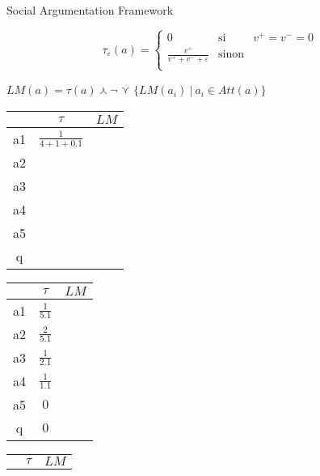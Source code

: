 \documentclass{beamer}
\begin{document}
  \begin{frame}{Social Argumentation Framework}
    \begin{overprint}
      $$
      \tau_\varepsilon(a) = \left\{
          \begin{array}{lll}
            0 & \mbox{si } & v^+ = v^- = 0\\
            \frac{v^+}{v^+ + v^- + \varepsilon} & \mbox{sinon} & \\
          \end{array}\right.$$

      $LM(a) = \tau(a) \curlywedge \neg$ {\Large $\curlyvee$} $\{LM(a_i)\ |\ a_i \in Att(a)\}$
    \end{overprint}


    \begin{minipage}[c]{.6\linewidth}
      \begin{overprint}
        \begin{tabular}{|c|c|c|}
          \hline
          & $\tau$ & $LM$\\
          \hline
          a1 & $\frac{1}{4+1+0.1}$ & \\
          \hline
          a2 & & \\
          \hline
          a3 & & \\
          \hline
          a4 & & \\
          \hline
          a5 & & \\
          \hline
          q & & \\
          \hline
        \end{tabular}
        \begin{tabular}{|c|c|c|}
          \hline
          & $\tau$ & $LM$\\
          \hline
          a1 & $\frac{1}{5.1}$ & \\
          \hline
          a2 & $\frac{2}{5.1}$ & \\
          \hline
          a3 & $\frac{1}{2.1}$ & \\
          \hline
          a4 & $\frac{1}{1.1}$ & \\
          \hline
          a5 & $0$ & \\
          \hline
          q & $0$ & \\
          \hline
        \end{tabular}
        \begin{tabular}{|c|c|c|}
          \hline
          & $\tau$ & $LM$\\

\end{tabular}
\end{overprint}
\end{minipage}
\end{frame}
\end{document}

